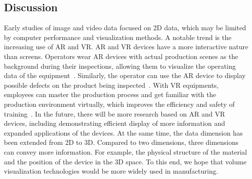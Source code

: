 \documentclass[a4paper,fleqn]{cas-dc}
\begin{document}
\subsection{Discussion}
Early studies of image and video data focused on 2D data, which may be limited by computer performance and visualization methods. A notable trend is the increasing use of AR and VR. 
AR and VR devices have a more interactive nature than screens. Operators wear AR devices with actual production scenes as the background during their inspections, allowing them to visualize the operating data of the equipment~\cite{Satkowski2021}. Similarly, the operator can use the AR device to display possible defects on the product being inspected~\cite{Murithi2020}. With VR equipments, employees can master the production process and get familiar with the production environment virtually, which improves the efficiency and safety of training~\cite{hamid2014virtual}. In the future, there will be more research based on AR and VR devices, including demonstrating efficient display of more information and expanded applications of the devices.
At the same time, the data dimension has been extended from 2D to 3D. Compared to two dimensions, three dimensions can convey more information. For example, the physical structure of the material and the position of the device in the 3D space. To this end, we hope that volume visualization technologies would be more widely used in manufacturing.
\end{document}
